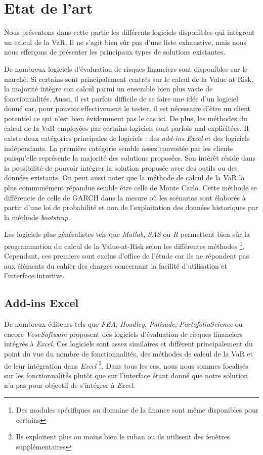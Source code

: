 \chapter{Etat de l'art}

	Nous présentons dans cette partie les différents logiciels disponibles qui intègrent un calcul de la VaR. Il ne s’agit bien sûr pas d’une liste exhaustive, mais nous nous efferçons de présenter les principaux types de solutions existantes.

	De nombreux logiciels d’évaluation de risques financiers sont disponibles sur le marché. Si certains sont principalement centrés sur le calcul de la Value-at-Risk, la majorité intègre son calcul parmi un ensemble bien plus vaste de fonctionnalités. 
	Aussi, il est parfois difficile de se faire une idée d’un logiciel donné car, pour pouvoir effectivement le tester, il est nécessaire d’être un client potentiel ce qui n’est bien évidemment pas le cas ici. De plus, les méthodes du calcul de la VaR employées par certains logiciels sont parfois mal explicitées.
	Il existe deux catégories principales de logiciels : des \textit{add-ins Excel} et des logiciels indépendants. La première catégorie semble assez convoitée par les clients puisqu’elle représente la majorité des solutions proposées. Son intérêt réside dans la possibilité de pouvoir intégrer la solution proposée avec des outils ou des données existants.
	On peut aussi noter que la méthode de calcul de la VaR la plus communément répandue semble être celle de Monte Carlo. Cette méthode se différencie de celle de GARCH dans la mesure où les scénarios sont élaborés à partir d’une loi de probabilité et non de l’exploitation des données historiques par la méthode \textit{bootstrap}.

	Les logiciels plus généralistes tels que \textit{Matlab}, \textit{SAS} ou \textit{R} permettent bien sûr la programmation du calcul de la Value-at-Risk selon les différentes méthodes \footnote{Des modules spécifiques au domaine de la finance sont même disponibles pour certains}. Cependant, ces premiers sont exclus d’office de l’étude car ils ne répondent pas aux éléments du cahier des charges concernant la facilité d’utilisation et l’interface intuitive.


	\section{Add-ins Excel}

		De nombreux éditeurs tels que \textit{FEA}, \textit{Hoadley}, \textit{Palisade}, \textit{PortofolioScience} ou encore \textit{VoseSoftware} proposent des logiciels d’évaluation de risques financiers intégrés à \textit{Excel}. Ces logiciels sont assez similaires et diffèrent principalement du point du vue du nombre de fonctionnalités, des méthodes de calcul de la VaR et de leur intégration dans \textit{Excel} \footnote{Ils exploitent plus ou moins bien le \gls{ruban} ou ils utilisent des fenêtres supplémentaires}. Dans tous les cas, nous nous sommes focalisés sur les fonctionnalités plutôt que sur l’interface étant donné que notre solution n’a pas pour objectif de s’intégrer à \textit{Excel}.

